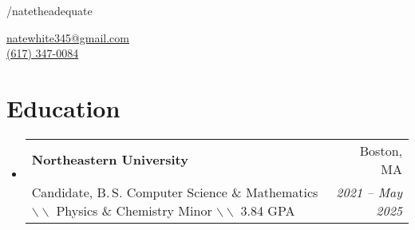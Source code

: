 \documentclass[letterpaper,11pt]{article}
\makeatletter
\newcommand{\resumeSubheadingSummary}[4]{
  \vspace{-1pt}\item
    \begin{tabular*}{0.97\textwidth}[t]{l@{\extracolsep{\fill}}r}
      \textbf{#1} & #2 \\
      \small#3 & \textit{\small #4}
    \end{tabular*}\vspace{-5pt}
}
\newcommand{\summarysep}{ \textcolor{black!50}{$ \backslash \backslash $ }}
\newcommand{\resumeSubHeadingListStart}{\begin{itemize}[leftmargin=*]}
\newcommand{\resumeSubHeadingListEnd}{\end{itemize}}
\makeatother
\begin{document}
\hypersetup{urlcolor=cyan}
\newcommand{\mysite}{www.github.com/natetheadequate}
\newcommand{\myemail}{natewhite345@gmail.com}
\newcommand{\link}[2]{\color{cyan}{\underline{\href{#1}{#2}}}}
\newcommand{\headingcap}[1]{\space $|$\space \space \textit{#1}}
\newcommand{\ghlink}[1]{\href{https://www.github.com/natetheadequate/#1}{
\faIcon{github}/#1}}
\newcommand{\ttull}[2]{\bgroup\markoverwith{\textcolor{cyan}{\hdashrule[-0.8ex]{1mm}{2.1pt}{1pt}}}\ULon{\href{#2}{#1}}}
\newcommand{\ttul}[1]{\bgroup\markoverwith{\textcolor{gray}{\hdashrule[-0.7ex][x]{1mm}{0.5pt}{0.5mm}}}\ULon{#1}}
\newcommand{\cttt}[3][\#]{\pdftooltip{\ttull{#2}{#1}}{#3}}
\newcommand{\ctt}[2]{\pdftooltip{\ttul{#1}}{#2}}
\newcommand{\csln}[1]{https://catalog.northeastern.edu/undergraduate/computer-information-science/computer-science/\#:~:text=#1}


\noindent %
\href{https://www.linkedin.com/in/natetheadequate}{} \href{https://www.github.com/natetheadequate}{}/natetheadequate\hfill %
\hfill 
\phantom{fffffffffffffffffffffffffffffffffff}
\vspace*{-20px}
\begin{flushright}
\href{mailto:\myemail}{\myemail}\\ \href{tel:
+016173470084}{(617) 347-0084}
\end{flushright}
\vspace*{-30pt}
\section{Education}
  \resumeSubHeadingListStart
     \resumeSubheadingSummary{Northeastern University \normalfont{$|$ Khoury College of Computer Sciences $|$ Honors}}{Boston, MA}{\BeginAccSupp{method=plain,ActualText={Candidate for a Bachelor of Science in Computer Science and Mathematics}}Candidate, B.\,S. Computer Science \& Mathematics\EndAccSupp{}\summarysep{} Physics \& Chemistry Minor \summarysep{} 3.84 GPA}{2021 -- May 2025}
   \resumeSubHeadingListEnd
\end{document}
